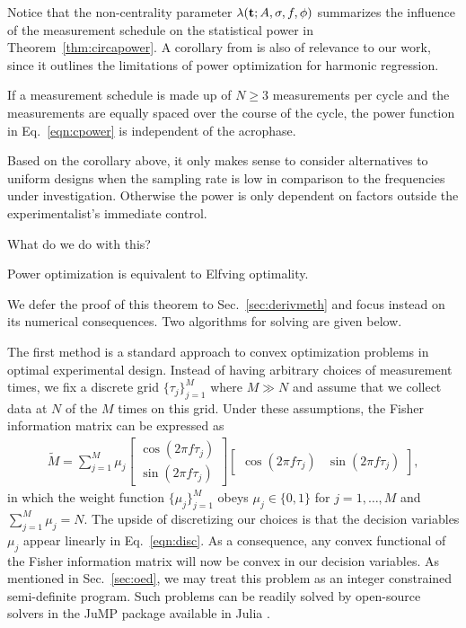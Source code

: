 \documentclass{article}
\begin{document}
Notice that the non-centrality parameter $\lambda(\mathbf{t};A,\sigma,f,\phi)$  summarizes the influence of the measurement schedule on the statistical power in Theorem~\ref{thm:circapower}. A corollary from \cite{wei2023circpower} is also of relevance to our work, since it outlines the limitations of power optimization for harmonic regression.
\begin{corollary}\label{cor:unif}
If a measurement schedule is made up of $N\geq3$ measurements per cycle and the measurements are equally spaced over the course of the cycle, the power function in Eq.~\eqref{eqn:cpower} is independent of the acrophase.
\end{corollary}
Based on the corollary above, it only makes sense to consider alternatives to uniform designs when the sampling rate is low in comparison to the frequencies under investigation. Otherwise the power is only dependent on factors outside the experimentalist's immediate control. 


What do we do with this?
\begin{theorem}
Power optimization is equivalent to Elfving optimality.
\end{theorem}
We defer the proof of this theorem to Sec.~\ref{sec:derivmeth} and focus instead on its numerical consequences. Two algorithms for solving are given below.

The first method is a standard approach to convex optimization problems in optimal experimental design. Instead of having arbitrary choices of measurement times, we fix a discrete grid $\{\tau_{j}\}_{j=1}^{M}$ where $M\gg N$ and assume that we collect data at $N$ of the $M$ times on this grid. Under these assumptions, the Fisher information matrix can be expressed as
\begin{align}
 \tilde{M} = \sum_{j=1}^{M}  \mu_j \begin{bmatrix}
        \cos(2\pi f \tau_j)\\ 
        \sin(2\pi f \tau_j)
    \end{bmatrix}
    \begin{bmatrix} \cos(2\pi f \tau_j) & \sin(2\pi f \tau_j) \end{bmatrix},\label{eqn:disc}
\end{align}
in which the weight function $\{\mu_{j}\}_{j=1}^{M}$ obeys $\mu_{j}\in \{0,1\}$ for $j=1,\ldots, M$ and $ \sum_{j=1}^{M} \mu_{j} = N$. 
The upside of discretizing our choices is that the decision variables $\mu_{j}$ appear linearly in Eq.~\eqref{eqn:disc}. As a consequence, any convex functional of the Fisher information matrix will now be convex in our decision variables. As mentioned in Sec.~\ref{sec:oed}, we may treat this problem as an integer constrained semi-definite program. Such problems can be readily solved by open-source solvers in the JuMP package available in Julia \cite{Lubin2023}.
\end{document}
